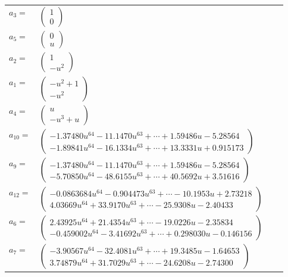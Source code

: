 \documentclass[1p]{elsarticle_modified}
\theoremstyle{definition}
\begin{document}
\begin{tabular}{m{7pt} m{180pt} m{7pt} m{180pt} }
\flushright $a_{3}=$&$\begin{pmatrix}1\\0\end{pmatrix}$ \\
\flushright $a_{5}=$&$\begin{pmatrix}0\\u\end{pmatrix}$ \\
\flushright $a_{2}=$&$\begin{pmatrix}1\\- u^2\end{pmatrix}$ \\
\flushright $a_{1}=$&$\begin{pmatrix}- u^2+1\\- u^2\end{pmatrix}$ \\
\flushright $a_{4}=$&$\begin{pmatrix}u\\- u^3+u\end{pmatrix}$ \\
\flushright $a_{10}=$&$\begin{pmatrix}-1.37480 u^{64}-11.1470 u^{63}+\cdots+1.59486 u-5.28564\\-1.89841 u^{64}-16.1334 u^{63}+\cdots+13.3331 u+0.915173\end{pmatrix}$ \\
\flushright $a_{9}=$&$\begin{pmatrix}-1.37480 u^{64}-11.1470 u^{63}+\cdots+1.59486 u-5.28564\\-5.70850 u^{64}-48.6155 u^{63}+\cdots+40.5692 u+3.51616\end{pmatrix}$ \\
\flushright $a_{12}=$&$\begin{pmatrix}-0.0863684 u^{64}-0.904473 u^{63}+\cdots-10.1953 u+2.73218\\4.03669 u^{64}+33.9170 u^{63}+\cdots-25.9308 u-2.40433\end{pmatrix}$ \\
\flushright $a_{6}=$&$\begin{pmatrix}2.43925 u^{64}+21.4354 u^{63}+\cdots-19.0226 u-2.35834\\-0.459002 u^{64}-3.41692 u^{63}+\cdots+0.298030 u-0.146156\end{pmatrix}$ \\
\flushright $a_{7}=$&$\begin{pmatrix}-3.90567 u^{64}-32.4081 u^{63}+\cdots+19.3485 u-1.64653\\3.74879 u^{64}+31.7029 u^{63}+\cdots-24.6208 u-2.74300\end{pmatrix}$ \\

\end{tabular}
\end{document}
